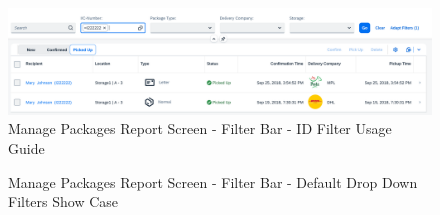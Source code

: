 \begin{figure}[htb]
	\centering
	\includegraphics[width=1\linewidth]{images/user_doc/managePack/ReportScreen/browse/defaultFreeTextIdUsage.png}
	\caption{Manage Packages Report Screen - Filter Bar - ID Filter Usage Guide}
	\label{fig:MPIDFIlter}
\end{figure}

\begin{figure}[H]
	\centering
	\hspace{5pt}

	\caption{Manage Packages Report Screen - Filter Bar - Default Drop Down Filters Show Case}
	\label{fig:MPDefaultDropDown}
\end{figure}

